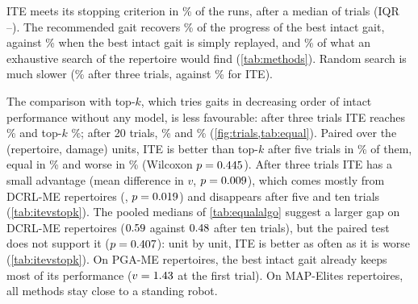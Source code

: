 \documentclass[11pt,a4paper]{article}
\newcommand{\ME}{MAP-Elites}
\newcommand{\PGA}{PGA-ME}
\newcommand{\DCRL}{DCRL-ME}
\begin{document}
\begin{table}[htbp]
\centering\small
\caption{Adaptation methods (median over repertoires, damages and repetitions). ``\% intact'': share of the progress
of the best intact gait; ``\% oracle'': share of the best gait available after damage.}
\label{tab:methods}

\vspace{1em}
\caption{Share of the intact progress (\%) recovered after a given number of trials (median).}
\label{tab:equal}

\end{table}

ITE meets its stopping criterion in \ITEStopRate\% of the runs, after a median of \ITETrials{} trials (IQR
\ITETrialsQone--\ITETrialsQthree). The recommended gait recovers \ITEPctIntact\% of the progress of the best intact
gait, against \BestIntactPct\% when the best intact gait is simply replayed, and \ITEPctOracle\% of what an exhaustive
search of the repertoire would find (\cref{tab:methods}). Random search is much slower (\RandomAtThree\% after three
trials, against \ITEAtThree\% for ITE).

The comparison with top-$k$, which tries gaits in decreasing order of intact performance without any model, is less
favourable: after three trials ITE reaches \ITEAtThree\% and top-$k$ \TopKAtThree\%; after 20 trials, \ITEAtTwenty\%
and \TopKAtTwenty\% (\cref{fig:trials,tab:equal}). Paired over the \NPairsTopK{} (repertoire, damage) units, ITE is
better than top-$k$ after five trials in \ITEWinsTopK\% of them, equal in \ITETiesTopK\% and worse in \ITELosesTopK\%
(Wilcoxon $p=0.445$). After three trials ITE has a small advantage (mean difference \DiffTopKThree{} in $v$,
$p=0.009$), which comes mostly from \DCRL{} repertoires (\DiffTopKThreeDCRL, $p=0.019$) and disappears
after five and ten trials (\cref{tab:itevstopk}). The pooled medians of \cref{tab:equalalgo} suggest a larger gap on
\DCRL{} repertoires ($0.59$ against $0.48$ after ten trials), but the paired test does not support it
($p=0.407$): unit by unit, ITE is better as often as it is worse (\cref{tab:itevstopk}). On \PGA{} repertoires, the best intact gait already keeps most of its
performance ($v=1.43$ at the first trial). On \ME{} repertoires, all methods stay close to a standing robot.

\begin{table}[htbp]
\centering\small
\caption{ITE against top-$k$ at equal numbers of trials: mean difference in absolute performance $v$ (ITE $-$ top-$k$),
number of units where ITE is better / equal / worse, and paired Wilcoxon test, over the (repertoire, damage) units.}
\label{tab:itevstopk}
\resizebox{\linewidth}{!}{}
\end{table}
\end{document}
